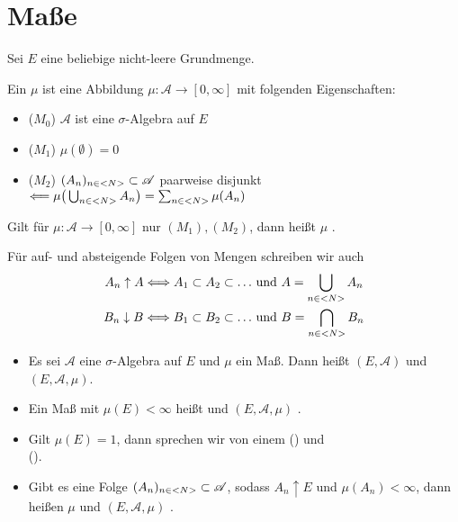 \section{Maße}

Sei $E$ eine beliebige nicht-leere Grundmenge.

\begin{definition}[Maß]
	Ein  $\mu$ ist eine Abbildung $\mu: \mathscr{A} \to [0,\infty]$ mit folgenden Eigenschaften:
	\begin{itemize}
		\item ($M_0$) $\mathscr{A}$ ist eine $\sigma$-Algebra auf $E$
		\item ($M_1$) $\mu(\emptyset) = 0$
		\item ($M_2$) $(A_n)_{n \in <N>} \subset \mathscr{A}$ paarweise disjunkt $\Longleftarrow \mu\big(\bigcup_{n\in <N>} A_n\big) = \sum_{n\in <N>} \mu(A_n)$
	\end{itemize}
	Gilt für $\mu: \mathscr{A} \to [0,\infty]$ nur $(M_1),(M_2)$, dann heißt $\mu$ .
\end{definition}

Für auf- und absteigende Folgen von Mengen schreiben wir auch
\begin{align}
	A_n \uparrow A \Longleftrightarrow A_1 \subset A_2 \subset \dots &\text{ und } A = \bigcup_{n\in <N>} A_n \notag \\
	B_n \downarrow B \Longleftrightarrow B_1 \subset B_2 \subset \dots &\text{ und } B = \bigcap_{n\in <N>} B_n \notag
\end{align}

\begin{definition}
	\begin{itemize}
		\item Es sei $\mathscr{A}$ eine $\sigma$-Algebra auf $E$ und $\mu$ ein Maß. Dann heißt $(E,\mathscr{A})$  und $(E,\mathscr{A},\mu)$.
		\item Ein Maß mit $\mu(E) < \infty$ heißt  und $(E,\mathscr{A},\mu)$ .
		\item Gilt $\mu(E)=1$, dann sprechen wir von einem  () und \\  ().
		\item Gibt es eine Folge $(A_n)_{n\in <N>} \subset \mathscr{A}$, sodass $A_n \uparrow E$ und $\mu(A_n) < \infty$, dann heißen $\mu$ und $(E,\mathscr{A},\mu)$ .
	\end{itemize}
\end{definition}

